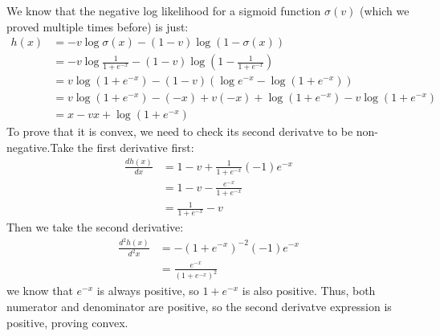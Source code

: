 \documentclass[11pt]{article}
\begin{document}
\begin{enumerate}
\begin{answertext}{14cm}{}
We know that the negative log likelihood for a sigmoid function $\sigma(v)$ (which we proved multiple times before) is just:
\begin{align*}
h(x) &= - v \log \sigma(x) - (1 - v) \log ( 1 - \sigma(x) ) \\
&=  - v \log \frac{1}{1 + e^{-x}} - (1 - v) \log ( 1 - \frac{1}{1 + e^{-x}} ) \\
&= v \log (1 + e^{-x}) - (1 - v) (\log e^{-x} - \log (1 + e^{-x}) ) \\
&=  v \log (1 + e^{-x}) - (-x) + v(-x) + \log (1 + e^{-x}) - v \log (1 + e^{-x}) \\
&= x - vx + \log (1 + e^{-x})
\end{align*} 
To prove that it is convex, we need to check its second derivatve to be non-negative.Take the first derivative first:
\begin{align*}
\frac {dh(x)}{dx} &= 1 - v + \frac{1}{1 + e^{-x}}(-1)e^{-x} \\
&= 1 - v -  \frac{e^{-x}}{1 + e^{-x}} \\
&= \frac{1}{1 + e^{-x}} -v
\end{align*}
Then we take the second derivative:
\begin{align*}
\frac {d^2h(x)}{d^2x} &= - (1+e^{-x})^{-2}(-1)e^{-x} \\
&= \frac{e^{-x}}{(1+e^{-x})^2}
\end{align*}
we know that $e^{-x}$ is always positive, so $1+e^{-x}$ is also positive. Thus, both numerator and denominator are positive, so the second derivatve expression is positive, proving convex.
  

\end{answertext}
\end{enumerate}
\end{document}
